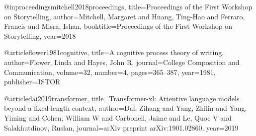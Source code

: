 @inproceedings{mitchell2018proceedings,
  title={Proceedings of the First Workshop on Storytelling},
  author={Mitchell, Margaret and Huang, Ting-Hao and Ferraro, Francis and Misra, Ishan},
  booktitle={Proceedings of the First Workshop on Storytelling},
  year={2018}
}

@article{flower1981cognitive,
  title={A cognitive process theory of writing},
  author={Flower, Linda and Hayes, John R},
  journal={College Composition and Communication},
  volume={32},
  number={4},
  pages={365--387},
  year={1981},
  publisher={JSTOR}
}

@article{dai2019transformer,
  title={Transformer-xl: Attentive language models beyond a fixed-length context},
  author={Dai, Zihang and Yang, Zhilin and Yang, Yiming and Cohen, William W and Carbonell, Jaime and Le, Quoc V and Salakhutdinov, Ruslan},
  journal={arXiv preprint arXiv:1901.02860},
  year={2019}
}

